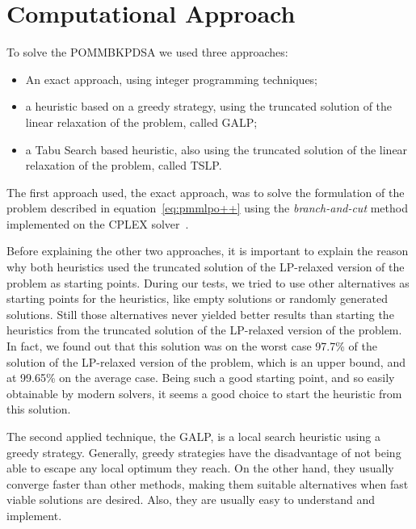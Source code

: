 \section{Computational Approach}
\label{sec:approach}

To solve the POMMBKPDSA we used three approaches:

\begin{itemize}
  \item An exact approach, using integer programming techniques;
  \item a heuristic based on a greedy strategy, using the truncated solution of the linear relaxation of the problem, called GALP;
  \item a Tabu Search based heuristic, also using the truncated solution of the linear relaxation of the problem, called TSLP.
\end{itemize}

The first approach used, the exact approach, was to solve the formulation of the problem described in 
equation~\ref{eq:pmmlpo++} using the \textit{branch-and-cut} method~\cite{padberg1991branch} implemented on the
CPLEX solver~\cite{Cplex}.

Before explaining the other two approaches, it is important to explain the reason why both heuristics used 
the truncated solution of the LP-relaxed version of the problem as starting points. During our tests, we tried 
to use other alternatives as starting points for the heuristics, like empty solutions or randomly generated 
solutions. Still those alternatives never yielded better results than starting the heuristics from the truncated
solution of the LP-relaxed version of the problem. In fact, we found out that this solution was on the worst case
97.7\% of the solution of the LP-relaxed version of the problem, which is an upper bound, and at 99.65\% on the average case.
Being such a good starting point, and so easily obtainable by modern solvers, it seems a good choice to start the 
heuristic from this solution.

The second applied technique, the GALP, is a local search heuristic using a greedy strategy. Generally, greedy strategies have the disadvantage 
of not being able to escape any local optimum they reach. On the other hand, they usually converge faster than other methods, 
making them suitable alternatives when fast viable solutions are desired. Also, they are usually easy to understand and implement.

